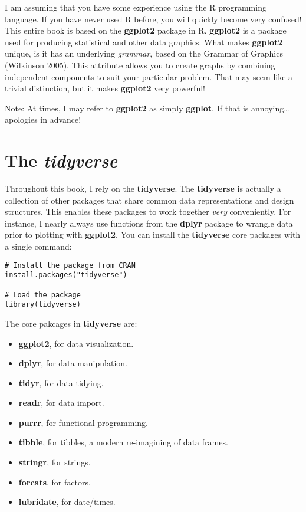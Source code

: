 \documentclass[
]{book}
\providecommand{\tightlist}{%
  \setlength{\itemsep}{0pt}\setlength{\parskip}{0pt}}
\begin{document}
I am assuming that you have some experience using the R programming language. If you have never used R before, you will quickly become very confused! This entire book is based on the \textbf{ggplot2} package in R. \textbf{ggplot2} is a package used for producing statistical and other data graphics. What makes \textbf{ggplot2} unique, is it has an underlying \emph{grammar}, based on the Grammar of Graphics (Wilkinson 2005). This attribute allows you to create graphs by combining independent components to suit your particular problem. That may seem like a trivial distinction, but it makes \textbf{ggplot2} very powerful!

Note: At times, I may refer to \textbf{ggplot2} as simply \textbf{ggplot}. If that is annoying\ldots{} apologies in advance!

\hypertarget{the-tidyverse}{%
\section{\texorpdfstring{The \emph{tidyverse}}{The tidyverse}}\label{the-tidyverse}}

Throughout this book, I rely on the \textbf{tidyverse}. The \textbf{tidyverse} is actually a collection of other packages that share common data representations and design structures. This enables these packages to work together \emph{very} conveniently. For instance, I nearly always use functions from the \textbf{dplyr} package to wrangle data prior to plotting with \textbf{ggplot2}. You can install the \textbf{tidyverse} core packages with a single command:

\begin{verbatim}
# Install the package from CRAN
install.packages("tidyverse")

# Load the package
library(tidyverse)
\end{verbatim}

The core pakcages in \textbf{tidyverse} are:

\begin{itemize}
\tightlist
\item
  \textbf{ggplot2}, for data visualization.
\item
  \textbf{dplyr}, for data manipulation.
\item
  \textbf{tidyr}, for data tidying.
\item
  \textbf{readr}, for data import.
\item
  \textbf{purrr}, for functional programming.
\item
  \textbf{tibble}, for tibbles, a modern re-imagining of data frames.
\item
  \textbf{stringr}, for strings.
\item
  \textbf{forcats}, for factors.
\item
  \textbf{lubridate}, for date/times.
\end{itemize}
\end{document}
